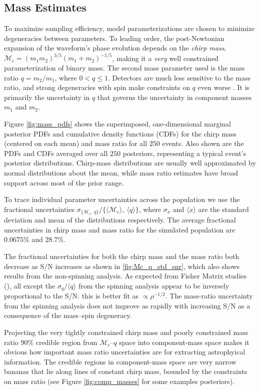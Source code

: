 \subsection{Mass Estimates}\label{sec:mass}
To maximize sampling efficiency, model parameterizations are chosen to minimize degeneracies between parameters.  To leading order, the post-Newtonian expansion of the waveform's phase evolution depends on the \emph{chirp mass}, $\mathcal{M}_\mathrm{c} = (m_1 m_2)^{3/5} (m_1 + m_2)^{-1/5}$, making it a \emph{very} well constrained parameterization of binary mass.  The second mass parameter used is the mass ratio $q = m_2/m_1$, where $0 < q \leq 1$.  Detectors are much less sensitive to the mass ratio, and strong degeneracies with spin make constraints on $q$ even worse \citep{Cutler_1994}.  It is primarily the uncertainty in $q$ that governs the uncertainty in component masses $m_1$ and $m_2$.

Figure \ref{fig:mass_pdfs} shows the superimposed, one-dimensional marginal posterior PDFs and cumulative density functions (CDFs) for the chirp mass (centered on each mean) and mass ratio for all $250$ events.  Also shown are the PDFs and CDFs averaged over all $250$ posteriors, representing a typical event's posterior distributions.  Chirp-mass distributions are usually well approximated by normal distributions about the mean, while mass ratio estimates have broad support across most of the prior range.

To trace individual parameter uncertainties across the population we use the fractional uncertainties $\sigma_{\{\mathcal{M}_\mathrm{c},~q\}}/\{\langle\mathcal{M}_\mathrm{c}\rangle,~\langle q\rangle\}$, where $\sigma_x$ and $\langle x\rangle$ are the standard deviation and mean of the distributions respectively. The average fractional uncertainties in chirp mass and mass ratio for the simulated population are $0.0675\%$ and $28.7\%$.

The fractional uncertainties for both the chirp mass and the mass ratio both decrease as S/N increases as shown in \ref{fig:Mc_q_std_snr}, which also shows results from the non-spinning analysis. As expected from Fisher Matrix studies (\citet[e.g.]{FinnChernoff}), all except the $\sigma_q/\langle q\rangle$ from the spinning analysis appear to be inversely proportional to the S/N: this is better fit as $\propto \rho^{-1/2}$. The mass-ratio uncertainty from the spinning analysis does not improve as rapidly with increasing S/N as a consequence of the mass--spin degeneracy.
  
Projecting the very tightly constrained chirp mass and poorly constrained mass ratio $90\%$ credible region from $\mathcal{M}_\mathrm{c}$--$q$ space into component-mass space makes it obvious how important mass ratio uncertainties are for extracting astrophyical information.  The credible regions in component-mass space are very narrow bananas that lie along lines of constant chirp mass, bounded by the constraints on mass ratio (see Figure \ref{fig:comp_masses} for some examples posteriors).
  
  
  
  
  
  
  
  
  
  
  
